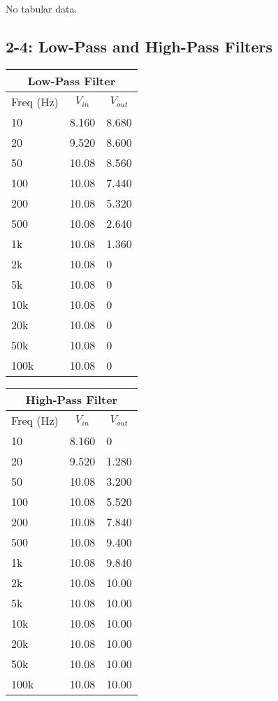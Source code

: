 \documentclass[%
 aip,
 jmp,
 amsmath,
 amssymb,
 reprint,%
 numerical,
 longbibliography,
]{revtex4-1}
\begin{document}
	No tabular data.
	
	\subsection{2-4: Low-Pass and High-Pass Filters}
	
	\begin{tabularx}{0.45\textwidth}[t]{| X | X | X |}
	\hline
	\multicolumn{3}{|c|}{Low-Pass Filter}\\
	\hline
		\multicolumn{1}{|c|}{Freq (Hz)} & 
		\multicolumn{1}{c|}{$V_{in}$} & 
		\multicolumn{1}{c|}{$V_{out}$} \\ 
	\hline
	10   & 8.160 & 8.680 \\ \hline
	20   & 9.520 & 8.600 \\ \hline
	50   & 10.08 & 8.560 \\ \hline
	100  & 10.08 & 7.440 \\ \hline
	200  & 10.08 & 5.320 \\ \hline
	500  & 10.08 & 2.640 \\ \hline
	1k   & 10.08 & 1.360 \\ \hline
	2k   & 10.08 & 0 \\ \hline
	5k   & 10.08 & 0 \\ \hline
	10k  & 10.08 & 0 \\ \hline
	20k  & 10.08 & 0 \\ \hline
	50k  & 10.08 & 0 \\ \hline
	100k & 10.08 & 0 \\ \hline	
	\end{tabularx}
	
	\begin{tabularx}{0.45\textwidth}[t]{| X | X | X |}
	\hline
	\multicolumn{3}{|c|}{High-Pass Filter}\\
	\hline
		\multicolumn{1}{|c|}{Freq (Hz)} & 
		\multicolumn{1}{c|}{$V_{in}$} & 
		\multicolumn{1}{c|}{$V_{out}$} \\ 
	\hline
	10   & 8.160 & 0 \\ \hline
	20   & 9.520 & 1.280 \\ \hline
	50   & 10.08 & 3.200 \\ \hline
	100  & 10.08 & 5.520 \\ \hline
	200  & 10.08 & 7.840 \\ \hline
	500  & 10.08 & 9.400 \\ \hline
	1k   & 10.08 & 9.840 \\ \hline
	2k   & 10.08 & 10.00 \\ \hline
	5k   & 10.08 & 10.00 \\ \hline
	10k  & 10.08 & 10.00 \\ \hline
	20k  & 10.08 & 10.00 \\ \hline
	50k  & 10.08 & 10.00 \\ \hline
	100k & 10.08 & 10.00 \\ \hline	
	\end{tabularx}
	
\end{document}
